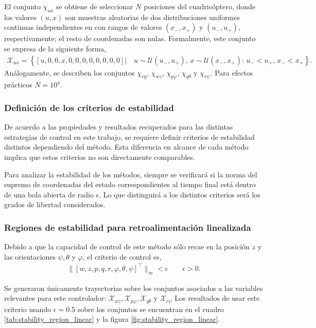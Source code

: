 El conjunto $\chi_{ux}$ se obtiene de seleccionar $N$ posiciones del cuadricóptero, donde los valores $(u, x)$ son muestras aleatorias de dos distribuciones uniformes continuas independientes en con rangos de valores $(x_{-}, x_{+})$ y  $(u_{-}, u_{+})$, respectivamente; el resto de coordenadas son nulas. Formalmente, este conjunto se expresa de la siguiente forma, 
\begin{align}
    \mathcal{X}_{ux} = \left\{[u, 0, 0, x, 0, 0, 0, 0, 0, 0, 0, 0]|\quad u \sim \mathcal{U}(u_{-}, u_{+})\text{, } x \sim \mathcal{U}(x_{-}, x_{+}) \text{: } u_{-} < u_{+}\text{, }x_{-} < x_{+}  \right\}.
\end{align}
Análogamente, se describen los conjuntos $\chi_{vy}$, $\chi_{wz}$, $\chi_{p\varphi}$, $\chi_{q\theta}$ y $\chi_{r\psi}$. Para efectos prácticos $N=10^4$.

\subsubsection{Definición de los criterios de estabilidad}
De acuerdo a las propiedades y resultados recuperados para las distintas estrategias de control en este trabajo, se requiere definir criterios de estabilidad distintos dependiendo del método. Esta diferencia en alcance de cada método implica que estos criterios no son directamente comparables. 

Para analizar la estabilidad de los métodos, siempre se verificará si la norma del supremo de coordenadas del estado correspondientes al tiempo final está dentro de una bola abierta de radio $\epsilon$. Lo que distinguirá a los distintos criterios será los grados de libertad considerados. 

\subsubsection{Regiones de estabilidad para retroalimentación linealizada}
Debido a que la capacidad de control de este método sólo recae en la posición $z$ y las orientaciones $\psi, \theta$ y $\varphi$, el criterio de control es, 
    \begin{align}
    \label{eq:lin_creteria}
        \|[w, z, p, q, r, \varphi, \theta, \psi]^{\top}\|_{\infty} < \epsilon \qquad \epsilon > 0.
    \end{align}

Se generaron únicamente trayectorias sobre los conjuntos asociados a las variables relevantes para este controlador: $\mathcal{X}_{wz}, \mathcal{X}_{p\varphi}, \mathcal{X}_{q\theta}$ y $\mathcal{X}_{r\psi}$ Los resultados de usar este criterio usando $\epsilon=0.5$ sobre los conjuntos se encuentran en el cuadro \ref{tab:stability_region_linear} y la figura \ref{fig:stability_region_linear}. 

